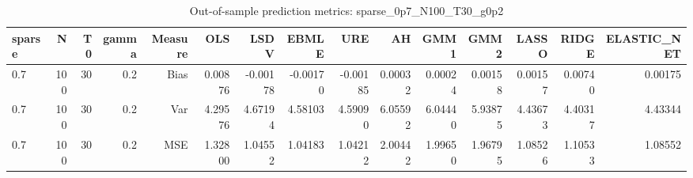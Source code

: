 \begin{table}[!htbp]\centering
\caption{Out-of-sample prediction metrics: sparse_0p7_N100_T30_g0p2}
\label{tab:table3_sparse_0p7_N100_T30_g0p2}
\begin{tabular}{lrrrrrrrrrrrrrr}
\hline
sparse & N & T0 & gamma & Measure & OLS & LSDV & EBMLE & URE & AH & GMM1 & GMM2 & LASSO & RIDGE & ELASTIC_NET \\
\hline
0.7 & 100 & 30 & 0.2 & Bias & 0.00876 & -0.00178 & -0.00170 & -0.00185 & 0.00032 & 0.00024 & 0.00158 & 0.00157 & 0.00740 & 0.00175 \\
0.7 & 100 & 30 & 0.2 & Var & 4.29576 & 4.67194 & 4.58103 & 4.59090 & 6.05592 & 6.04440 & 5.93875 & 4.43673 & 4.40317 & 4.43344 \\
0.7 & 100 & 30 & 0.2 & MSE & 1.32800 & 1.04552 & 1.04183 & 1.04212 & 2.00442 & 1.99650 & 1.96795 & 1.08526 & 1.10533 & 1.08552 \\
\hline
\end{tabular}
\end{table}

